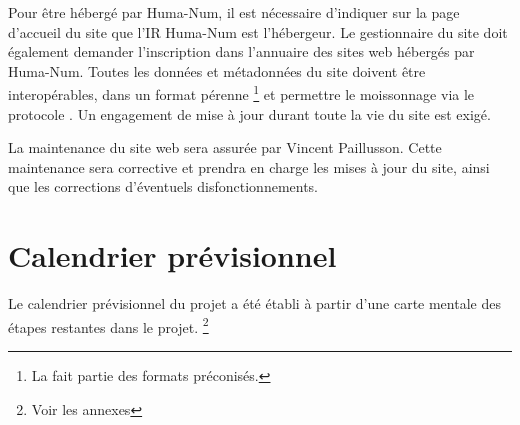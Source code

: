 Pour être hébergé par Huma-Num, il est nécessaire d’indiquer sur la page d’accueil du site que l’IR Huma-Num est l’hébergeur. Le gestionnaire du site doit également demander l’inscription dans l’annuaire des sites web hébergés par Huma-Num. Toutes les données et métadonnées du site doivent être interopérables, dans un format pérenne \footnote{La \TEI fait partie des formats préconisés.} et permettre le moissonnage via le protocole \oai. Un engagement de mise à jour durant toute la vie du site est exigé. 

La maintenance du site web sera assurée par Vincent Paillusson. Cette maintenance sera corrective et prendra en charge les mises à jour du site, ainsi que les corrections d’éventuels disfonctionnements. 

\newpage
\section*{Calendrier prévisionnel}
Le calendrier prévisionnel du projet a été établi à partir d’une carte mentale des étapes restantes dans le projet. \footnote{Voir les annexes}

